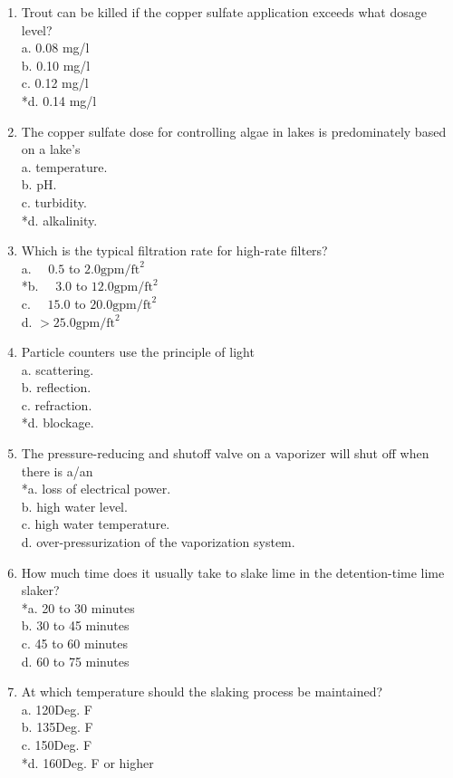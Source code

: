 \begin{enumerate}
\item Trout can be killed if the copper sulfate application exceeds what dosage level?\\
a. 0.08 mg/l\\
b. 0.10 mg/l\\
c. 0.12 mg/l\\
*d. 0.14 mg/l\\

  \item The copper sulfate dose for controlling algae in lakes is predominately based on a lake's\\
a. temperature.\\
b. pH.\\
c. turbidity.\\
*d. alkalinity.\\

  \item Which is the typical filtration rate for high-rate filters?\\
a. $\quad 0.5$ to $2.0 \mathrm{gpm} / \mathrm{ft}^{2}$\\
*b. $\quad 3.0$ to $12.0 \mathrm{gpm} / \mathrm{ft}^{2}$\\
c. $\quad 15.0$ to $20.0 \mathrm{gpm} / \mathrm{ft}^{2}$\\
d. $>25.0 \mathrm{gpm} / \mathrm{ft}^{2}$\\

 \item Particle counters use the principle of light\\
a. scattering.\\
b. reflection.\\
c. refraction.\\
*d. blockage.\\

  \item The pressure-reducing and shutoff valve on a vaporizer will shut off when there is a/an\\
*a. loss of electrical power.\\
b. high water level.\\
c. high water temperature.\\
d. over-pressurization of the vaporization system. 
 
  \item How much time does it usually take to slake lime in the detention-time lime slaker?\\
*a. 20 to 30 minutes\\
b. 30 to 45 minutes\\
c. 45 to 60 minutes\\
d. 60 to 75 minutes\\
  \item At which temperature should the slaking process be maintained?\\
a. 120Deg. F\\
b. 135Deg. F\\
c. 150Deg. F\\
*d. 160Deg. F or higher\\


\end{enumerate}
